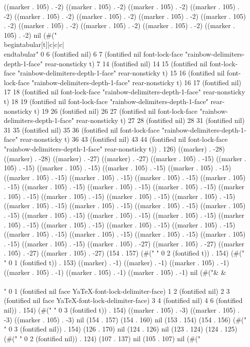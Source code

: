 ((marker . 105) . -2) ((marker . 105) . -2) ((marker . 105) . -2) ((marker . 105) . -2) ((marker . 105) . -2) ((marker . 105) . -2) ((marker . 105) . -2) ((marker . 105) . -2) ((marker . 105) . -2) ((marker . 105) . -2) ((marker . 105) . -2) ((marker . 105) . -2) nil (#("\\begin{tabular}[t]{|c|c|c|}
   \\end{tabular}" 0 6 (fontified nil) 6 7 (fontified nil font-lock-face "rainbow-delimiters-depth-1-face" rear-nonsticky t) 7 14 (fontified nil) 14 15 (fontified nil font-lock-face "rainbow-delimiters-depth-1-face" rear-nonsticky t) 15 16 (fontified nil font-lock-face "rainbow-delimiters-depth-1-face" rear-nonsticky t) 16 17 (fontified nil) 17 18 (fontified nil font-lock-face "rainbow-delimiters-depth-1-face" rear-nonsticky t) 18 19 (fontified nil font-lock-face "rainbow-delimiters-depth-1-face" rear-nonsticky t) 19 26 (fontified nil) 26 27 (fontified nil font-lock-face "rainbow-delimiters-depth-1-face" rear-nonsticky t) 27 28 (fontified nil) 28 31 (fontified nil) 31 35 (fontified nil) 35 36 (fontified nil font-lock-face "rainbow-delimiters-depth-1-face" rear-nonsticky t) 36 43 (fontified nil) 43 44 (fontified nil font-lock-face "rainbow-delimiters-depth-1-face" rear-nonsticky t)) . 126) ((marker) . -28) ((marker) . -28) ((marker) . -27) ((marker) . -27) ((marker . 105) . -15) ((marker . 105) . -15) ((marker . 105) . -15) ((marker . 105) . -15) ((marker . 105) . -15) ((marker . 105) . -15) ((marker . 105) . -15) ((marker . 105) . -15) ((marker . 105) . -15) ((marker . 105) . -15) ((marker . 105) . -15) ((marker . 105) . -15) ((marker . 105) . -15) ((marker . 105) . -15) ((marker . 105) . -15) ((marker . 105) . -15) ((marker . 105) . -15) ((marker . 105) . -15) ((marker . 105) . -15) ((marker . 105) . -15) ((marker . 105) . -15) ((marker . 105) . -15) ((marker . 105) . -15) ((marker . 105) . -15) ((marker . 105) . -15) ((marker . 105) . -15) ((marker . 105) . -15) ((marker . 105) . -15) ((marker . 105) . -15) ((marker . 105) . -15) ((marker . 105) . -15) ((marker . 105) . -15) ((marker . 105) . -27) ((marker . 105) . -27) ((marker . 105) . -27) ((marker . 105) . -27) (154 . 157) (#("  " 0 2 (fontified t)) . 154) (#("
" 0 1 (fontified t)) . 153) ((marker) . -1) ((marker) . -1) ((marker . 105) . -1) ((marker . 105) . -1) ((marker . 105) . -1) ((marker . 105) . -1) nil (#("& & \\\\" 0 1 (fontified nil face YaTeX-font-lock-delimiter-face) 1 2 (fontified nil) 2 3 (fontified nil face YaTeX-font-lock-delimiter-face) 3 4 (fontified nil) 4 6 (fontified nil)) . 154) (#("   " 0 3 (fontified t)) . 154) ((marker . 105) . -3) ((marker . 105) . -3) ((marker . 105) . -3) nil (154 . 157) (154 . 160) nil (153 . 154) (154 . 156) (#("   " 0 3 (fontified nil)) . 154) (126 . 170) nil (124 . 126) nil (123 . 124) (124 . 125) (#("  " 0 2 (fontified nil)) . 124) (107 . 137) nil (105 . 107) nil (#("
